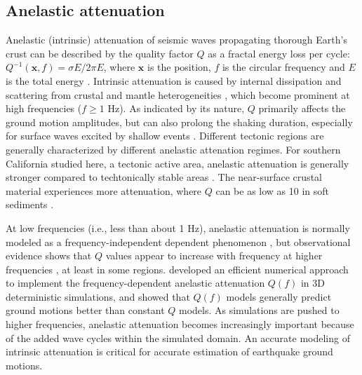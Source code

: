 \subsection{Anelastic attenuation}

Anelastic (intrinsic) attenuation of seismic waves propagating thorough Earth's crust can be described by the quality factor $Q$ as a fractal energy loss per cycle: $Q^{-1}(\textbf{x}, f) = \sigma E / 2\pi E$, where $\textbf{x}$ is the position, $f$ is the circular frequency and $E$ is the total energy \citep{oconnellMeasuresDissipationViscoelastic1978} . Intrinsic attenuation is caused by internal dissipation and scattering from crustal and mantle heterogeneities \citep{satoSeismicWavePropagation2009}, which become prominent at high frequencies ($f \geqslant  1$ Hz). As indicated by its nature, $Q$ primarily affects the ground motion amplitudes, but can also prolong the shaking duration, especially for surface waves excited by shallow events \citep{imperatoriRoleTopographyLateral2015, laiShallowBasinStructure2020}. Different tectonic regions are generally characterized by different anelastic attenation regimes. For southern California studied here, a tectonic active area, anelastic attenuation is generally stronger compared to techtonically stable areas \citep{frankelAttenuationHighfrequencyShear1990,ericksonFrequencyDependentLgContinental2004}. The near-surface crustal material experiences more attenuation, where $Q$ can be as low as 10 in soft sediments \citep{asterHighfrequencyBoreholeSeismograms1991,abercrombieNearsurfaceAttenuationSite1997}.

At low frequencies (i.e., less than about 1 Hz), anelastic attenuation is normally modeled as a frequency-independent dependent phenomenon \citep{akiQuantitativeSeismology2002}, but observational evidence shows that $Q$ values appear to increase with frequency at higher frequencies , at least in some regions. \citet{withersMemoryEfficientSimulation2015} developed an efficient numerical approach to implement the frequency-dependent anelastic attenuation $Q(f)$ in 3D deterministic simulations, and showed that $Q(f)$ models generally predict ground motions better than constant $Q$ models. As simulations are pushed to higher frequencies, anelastic attenuation becomes increasingly important because of the added wave cycles within the simulated domain. An accurate modeling of intrinsic attenuation is critical for accurate estimation of earthquake ground motions.

